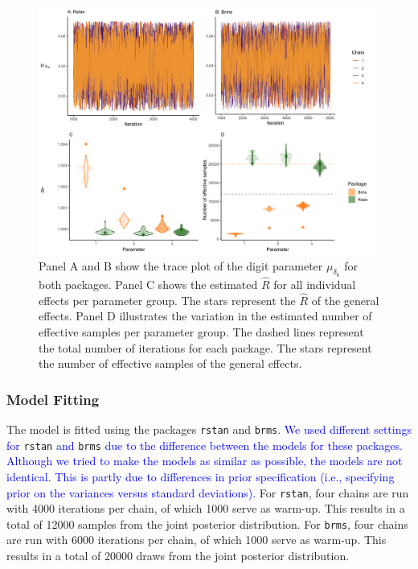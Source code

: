\documentclass[
  english,
  doc,floatsintext]{apa6}
\begin{document}
\begin{figure}[H]

\includegraphics[width=1\linewidth]{I - Images/Fig9_traceplots3pnew_v2} \hfill{}

\caption{Panel A and B show the trace plot of the digit parameter $\mu_{\delta_{6}}$ for both packages. Panel C shows the estimated $\hat{R}$ for all individual effects per parameter group. The stars represent the $\hat{R}$ of the general effects. Panel D illustrates the variation in the estimated number of effective samples per parameter group. The dashed lines represent the total number of iterations for each package. The stars represent the number of effective samples of the general effects.}\label{fig:traceplots3p}
\end{figure}

\hypertarget{model-fitting}{%
\subsubsection{Model Fitting}\label{model-fitting}}

The model is fitted using the packages \texttt{rstan} and \texttt{brms}. \textcolor{blue}{We used different settings for} \texttt{rstan} \textcolor{blue}{and} \texttt{brms} \textcolor{blue}{due to the difference between the models for these packages. Although we tried to make the models as similar as possible, the models are not identical. This is partly due to differences in prior specification (i.e., specifying prior on the variances versus standard deviations).} For \texttt{rstan}, four chains are run with 4000 iterations per chain, of which 1000 serve as warm-up. This results in a total of 12000 samples from the joint posterior distribution. For \texttt{brms}, four chains are run with 6000 iterations per chain, of which 1000 serve as warm-up. This results in a total of 20000 draws from the joint posterior distribution.
\end{document}

